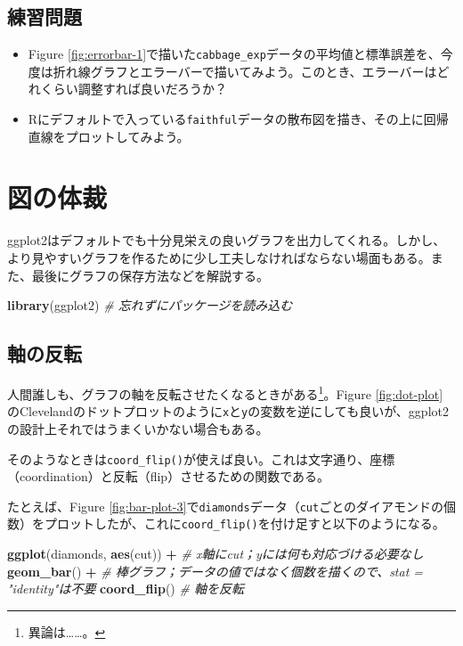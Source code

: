 \documentclass[]{book}
\newenvironment{Shaded}{\begin{snugshade}}{\end{snugshade}}
\newcommand{\KeywordTok}[1]{\textcolor[rgb]{0.13,0.29,0.53}{\textbf{#1}}}
\newcommand{\StringTok}[1]{\textcolor[rgb]{0.31,0.60,0.02}{#1}}
\newcommand{\CommentTok}[1]{\textcolor[rgb]{0.56,0.35,0.01}{\textit{#1}}}
\newcommand{\OperatorTok}[1]{\textcolor[rgb]{0.81,0.36,0.00}{\textbf{#1}}}
\newcommand{\NormalTok}[1]{#1}
\let\rmarkdownfootnote\footnote%
\def\footnote{\protect\rmarkdownfootnote}
\begin{document}
\section{練習問題}\label{-4}

\begin{itemize}
\item
  Figure
  \ref{fig:errorbar-1}で描いた\texttt{cabbage\_exp}データの平均値と標準誤差を、今度は折れ線グラフとエラーバーで描いてみよう。このとき、エラーバーはどれくらい調整すれば良いだろうか？
\item
  Rにデフォルトで入っている\texttt{faithful}データの散布図を描き、その上に回帰直線をプロットしてみよう。
\end{itemize}

\chapter{図の体裁}\label{appearance}

ggplot2はデフォルトでも十分見栄えの良いグラフを出力してくれる。しかし、より見やすいグラフを作るために少し工夫しなければならない場面もある。また、最後にグラフの保存方法などを解説する。

\begin{Shaded}
\begin{Highlighting}[]
\KeywordTok{library}\NormalTok{(ggplot2) }\CommentTok{# 忘れずにパッケージを読み込む}
\end{Highlighting}
\end{Shaded}

\section{軸の反転}

人間誰しも、グラフの軸を反転させたくなるときがある\footnote{異論は\ldots{}\ldots{}。}。Figure
\ref{fig:dot-plot}
のClevelandのドットプロットのように\texttt{x}と\texttt{y}の変数を逆にしても良いが、ggplot2の設計上それではうまくいかない場合もある。

そのようなときは\texttt{coord\_flip()}が使えば良い。これは文字通り、座標（coordination）と反転（flip）させるための関数である。

たとえば、Figure
\ref{fig:bar-plot-3}で\texttt{diamonds}データ（\texttt{cut}ごとのダイアモンドの個数）をプロットしたが、これに\texttt{coord\_flip()}を付け足すと以下のようになる。



\begin{Shaded}
\begin{Highlighting}[]
\KeywordTok{ggplot}\NormalTok{(diamonds, }\KeywordTok{aes}\NormalTok{(cut)) }\OperatorTok{+}\StringTok{ }\CommentTok{# x軸にcut；yには何も対応づける必要なし}
\StringTok{  }\KeywordTok{geom_bar}\NormalTok{() }\OperatorTok{+}\StringTok{ }\CommentTok{# 棒グラフ；データの値ではなく個数を描くので、stat = "identity"は不要}
\StringTok{  }\KeywordTok{coord_flip}\NormalTok{() }\CommentTok{# 軸を反転}
\end{Highlighting}
\end{Shaded}
\end{document}
